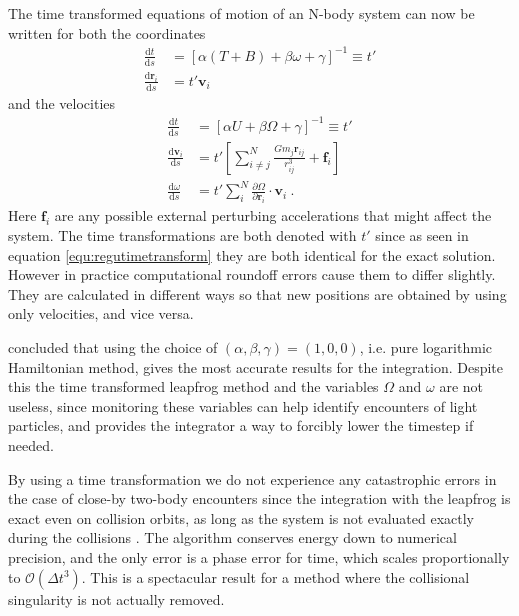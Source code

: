 \documentclass[english, oneside]{HYgradu}
\begin{document}
The time transformed equations of motion of an N-body system can now be written for both the coordinates
\begin{equation}
\begin{aligned}
\frac{\mathrm{d}t}{\mathrm{d}s} &= [\alpha (T + B) + \beta \omega + \gamma]^{-1} \equiv t' \\
\frac{\mathrm{d}\boldsymbol{r}_i}{\mathrm{d}s} &= t' \boldsymbol{v}_i
\end{aligned} \label{equ:tteompositions}
\end{equation}
and the velocities
\begin{equation}
\begin{aligned}
\frac{\mathrm{d}t}{\mathrm{d}s} &= [\alpha U + \beta \Omega + \gamma]^{-1} \equiv t' \\
\frac{\mathrm{d}\boldsymbol{v}_i}{\mathrm{d}s} &= t' \left[ \sum_{i \neq j}^N \frac{G m_j \boldsymbol{r}_{ij}}{r_{ij}^3} + \boldsymbol{f}_i \right] \\
\frac{\mathrm{d} \omega}{\mathrm{d}s} &= t' \sum_i^N \frac{\partial \Omega}{\partial \boldsymbol{r}_i} \cdot \boldsymbol{v}_i \ .
\end{aligned} \label{equ:tteomvelocities}
\end{equation}
Here $\boldsymbol{f}_i$ are any possible external perturbing accelerations that might affect the system. The time transformations are both denoted with $t'$ since as seen in equation \ref{equ:regutimetransform} they are both identical for the exact solution. However in practice computational roundoff errors cause them to differ slightly. They are calculated in different ways so that new positions are obtained by using only velocities, and vice versa.

\cite{mikkola:2008b} concluded that using the choice of $(\alpha, \beta, \gamma) = (1,0,0)$, i.e. pure logarithmic Hamiltonian method, gives the most accurate results for the integration. Despite this the time transformed leapfrog method and the variables $\Omega$ and $\omega$ are not useless, since monitoring these variables can help identify encounters of light particles, and provides the integrator a way to forcibly lower the timestep if needed.

By using a time transformation we do not experience any catastrophic errors in the case of close-by two-body encounters since the integration with the leapfrog is exact even on collision orbits, as long as the system is not evaluated exactly during the collisions \citep{mikkola:1999}. The algorithm conserves energy down to numerical precision, and the only error is a phase error for time, which scales proportionally to $\mathcal{O}(\Delta t^3)$. This is a spectacular result for a method where the collisional singularity is not actually removed.
\end{document}
